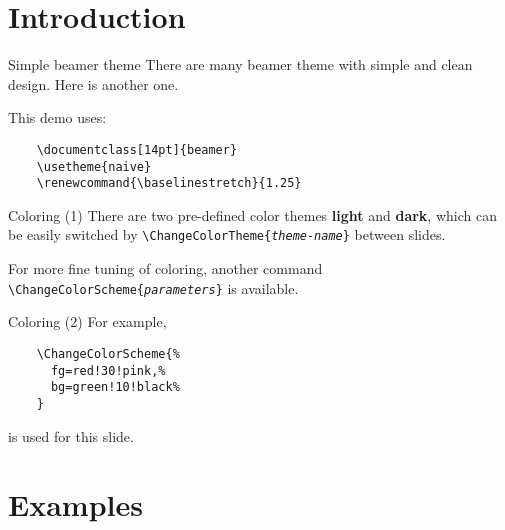 \documentclass[14pt]{beamer}
\title{\Naive}
\subtitle{Yet another simple beamer theme}
\author{Takahiro Ueda}
\institute{\url{https://github.com/tueda/beamertheme-naive}}
\date{24 January 2021}
\renewcommand{\baselinestretch}{1.25}
\begin{document}
\maketitle

\section{Introduction}

\begin{frame}[fragile]{Simple beamer theme}
  There are many beamer theme with simple and clean design.
  Here is another one.

  \pause

  This demo uses:
  \begin{verbatim}
    \documentclass[14pt]{beamer}
    \usetheme{naive}
    \renewcommand{\baselinestretch}{1.25}\end{verbatim}
\end{frame}


\begin{frame}{Coloring (1)}
  There are two pre-defined color themes \textbf{light} and \textbf{dark},
  which can be easily switched by
  \texttt{\textbackslash ChangeColorTheme\{\textit{theme-name}\}}
  between slides.

  \pause

  For more fine tuning of coloring, another command
  \texttt{\textbackslash ChangeColorScheme\{\textit{parameters}\}}
  is available.
\end{frame}


\begin{frame}[fragile]{Coloring (2)}
  For example,
  \begin{verbatim}
    \ChangeColorScheme{%
      fg=red!30!pink,%
      bg=green!10!black%
    }\end{verbatim}
  is used for this slide.
\end{frame}


\section{Examples}
\end{document}
